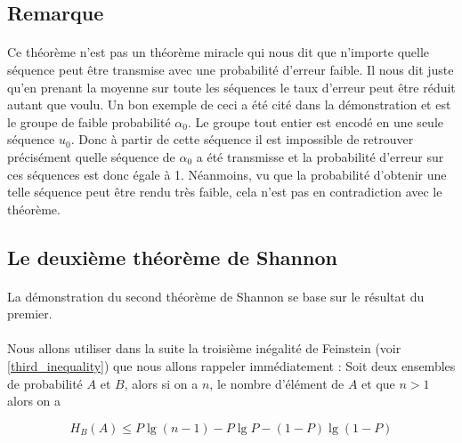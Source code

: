 \subsection*{Remarque}

	\paragraph{}
	Ce théorème n'est pas un théorème miracle qui nous dit que n'importe quelle
	séquence peut être transmise avec une probabilité d'erreur faible.
	Il nous dit juste qu'en prenant la moyenne sur toute les séquences le taux 
	d'erreur peut être réduit autant que voulu. Un bon exemple
	de ceci a été cité dans la démonstration et est le groupe de faible 
	probabilité $\alpha_0$. Le groupe tout entier est encodé en une 
	seule séquence $u_0$. Donc à partir de cette séquence il est impossible 
	de retrouver précisément quelle séquence de $\alpha_0$ a été transmisse 
	et la probabilité d'erreur sur ces séquences est donc égale à 1. 
	Néanmoins, vu que la probabilité d'obtenir une telle séquence peut être 
	rendu très faible, cela n'est pas en contradiction avec le théorème.
	
	
	
	
	
	
	
	
	
	
	
	
	
\subsection{Le deuxième théorème de Shannon}

	\paragraph{}La démonstration du second théorème de Shannon se base sur le 
	résultat du premier. 
	
	\paragraph{}
	Nous allons utiliser dans la suite la troisième inégalité de Feinstein 
	(voir \ref{third_inequality}) que nous allons rappeler immédiatement :
	Soit deux ensembles de probabilité $A$ et $B$, alors si on a $n$, le 
	nombre d'élément de $A$ et que $n>1$ alors on a 
	
	\[H_B(A)\le P\lg (n-1) - P\lg P - (1-P)\lg(1-P)\]
	

